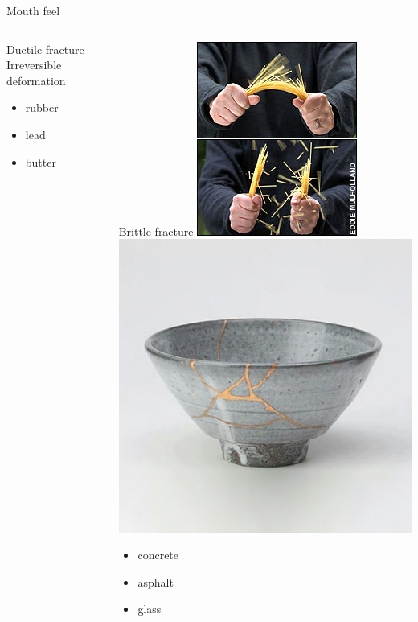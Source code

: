 \documentclass[xcolor=table]{beamer}
\begin{document}
\begin{frame}{Mouth feel}
\begin{columns}[T]
\begin{block}{Ductile fracture}
Irreversible deformation
\begin{itemize}
\item rubber
\item lead
\item butter
\end{itemize}
\end{block}

\begin{block}{Brittle fracture}
\includegraphics[height=6\baselineskip]{spaghetti_breaking}\hfill
\includegraphics[height=6\baselineskip]{Tea_bowl_fixed_in_the_Kintsugi_method}
\begin{itemize}
\item concrete
\item asphalt
\item glass
\end{itemize}

\end{block}
\end{columns}
\end{frame}
\end{document}
